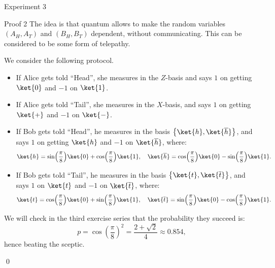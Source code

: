 \documentclass[a4paper]{article}
\begin{document}
\begin{parag}{Experiment 3}
    \begin{subparag}{Proof 2}
        The idea is that quantum allows to make the random variables $\left(A_H, A_T\right)$ and $\left(B_H, B_T\right)$ dependent, without communicating. This can be considered to be some form of telepathy.
    
        We consider the following protocol.
        \begin{itemize}
            \item If Alice gets told ``Head'', she measures in the $Z$-basis and says $1$ on getting $\ket{0}$ and $-1$ on $\ket{1}$.
            \item If Alice gets told ``Tail'', she measures in the $X$-basis, and says $1$ on getting $\ket{+}$ and $-1$ on $\ket{-}$. 
            \item If Bob gets told ``Head'', he measures in the basis $\left\{\ket{h}, \ket{\bar{h}}\right\}$, and says $1$ on getting $\ket{h}$ and $-1$ on $\ket{\bar{h}}$, where: 
            \[\ket{h} = \sin\left(\frac{\pi}{8}\right) \ket{0} + \cos\left(\frac{\pi}{8}\right)\ket{1}, \mathspace \ket{\bar{h}} = \cos\left(\frac{\pi}{8}\right)\ket{0} - \sin\left(\frac{\pi}{8}\right)\ket{1}.\]
         \item  If Bob gets told ``Tail'', he measures in the basis $\left\{\ket{t}, \ket{\bar{t}}\right\}$, and says $1$ on $\ket{t}$ and $-1$ on $\ket{\bar{t}}$, where: 
            \[\ket{t} = \cos\left(\frac{\pi}{8}\right) \ket{0} + \sin\left(\frac{\pi}{8}\right)\ket{1}, \mathspace \ket{\bar{t}} = \sin\left(\frac{\pi}{8}\right)\ket{0} - \cos\left(\frac{\pi}{8}\right) \ket{1}.\]
        \end{itemize}
        
        We will check in the third exercise series that the probability they succeed is: 
        \[p = \cos\left(\frac{\pi}{8}\right)^2 = \frac{2 + \sqrt{2}}{4} \approx 0.854,\]
        hence beating the sceptic.

        \qed
    \end{subparag}
\end{parag}
\end{document}
